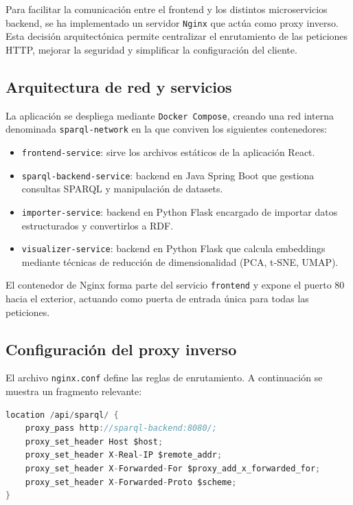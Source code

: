 \documentclass{article}
\begin{document}
Para facilitar la comunicación entre el frontend y los distintos microservicios backend, se ha implementado un servidor \texttt{Nginx} que actúa como proxy inverso. Esta decisión arquitectónica permite centralizar el enrutamiento de las peticiones HTTP, mejorar la seguridad y simplificar la configuración del cliente.

\subsection{Arquitectura de red y servicios}

La aplicación se despliega mediante \texttt{Docker Compose}, creando una red interna denominada \texttt{sparql-network} en la que conviven los siguientes contenedores:

\begin{itemize}
    \item \texttt{frontend-service}: sirve los archivos estáticos de la aplicación React.
    \item \texttt{sparql-backend-service}: backend en Java Spring Boot que gestiona consultas SPARQL y manipulación de datasets.
    \item \texttt{importer-service}: backend en Python Flask encargado de importar datos estructurados y convertirlos a RDF.
    \item \texttt{visualizer-service}: backend en Python Flask que calcula embeddings mediante técnicas de reducción de dimensionalidad (PCA, t‑SNE, UMAP).
\end{itemize}

El contenedor de Nginx forma parte del servicio \texttt{frontend} y expone el puerto 80 hacia el exterior, actuando como puerta de entrada única para todas las peticiones.

\subsection{Configuración del proxy inverso}

El archivo \texttt{nginx.conf} define las reglas de enrutamiento. A continuación se muestra un fragmento relevante:

\begin{lstlisting}[language=java, basicstyle=\small\ttfamily]
location /api/sparql/ {
    proxy_pass http://sparql-backend:8080/;
    proxy_set_header Host $host;
    proxy_set_header X-Real-IP $remote_addr;
    proxy_set_header X-Forwarded-For $proxy_add_x_forwarded_for;
    proxy_set_header X-Forwarded-Proto $scheme;
}
\end{lstlisting}
\end{document}
